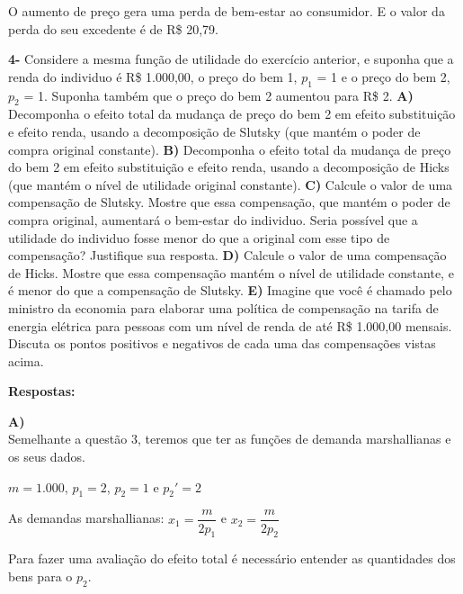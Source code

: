 \begin{flushleft}
\begin{center}
O aumento de preço gera uma perda de bem-estar ao consumidor. E o valor da perda do seu excedente é de R\$ 20,79.
\end{center}

\singlespacing

\textbf{4-} Considere a mesma função de utilidade do exercício anterior, e suponha que a renda do individuo é R\$ 1.000,00, o preço do bem 1, $p_{1}$ = 1 e o preço do bem 2, $p_{2}$ = 1. Suponha também que o preço do bem 2 aumentou para R\$ 2.
\singlespacing
\textbf{A)} Decomponha o efeito total da mudança de preço do bem 2 em efeito substituição e efeito renda, usando a decomposição de Slutsky (que mantém o poder de compra original constante).
\singlespacing
\textbf{B)} Decomponha o efeito total da mudança de preço do bem 2 em efeito substituição e efeito renda, usando a decomposição de Hicks (que mantém o nível de utilidade original constante).
\singlespacing
\textbf{C)} Calcule o valor de uma compensação de Slutsky. Mostre que essa compensação, que mantém o poder de compra original, aumentará o bem-estar do individuo. Seria possível que a utilidade do individuo fosse menor do que a original com esse tipo de compensação?
Justifique sua resposta.
\singlespacing
\textbf{D)} Calcule o valor de uma compensação de Hicks. Mostre que essa compensação mantém o nível de utilidade constante, e é menor do que a compensação de Slutsky.
\singlespacing
\textbf{E)} Imagine que você é chamado pelo ministro da economia para elaborar uma política de compensação na tarifa de energia elétrica para pessoas com um nível de renda de até R\$ 1.000,00 mensais. Discuta os pontos positivos e negativos de cada uma das compensações vistas acima.

\singlespacing

\textbf{Respostas:}

\singlespacing

\textbf{A)}
\\
Semelhante a questão 3, teremos que ter as funções de demanda marshallianas e os seus dados.
\begin{center}
$m = 1.000$, $p_{1} = 2$, $p_{2} = 1$ e $p_{2}' = 2$
\end{center}
\begin{center}
As demandas marshallianas: $x_{1} = \dfrac{m}{2p_{1}}$ e $x_{2} = \dfrac{m}{2p_{2}}$
\end{center}
Para fazer uma avaliação do efeito total é necessário entender as quantidades dos bens para o $p_{2}$.


\end{flushleft}
